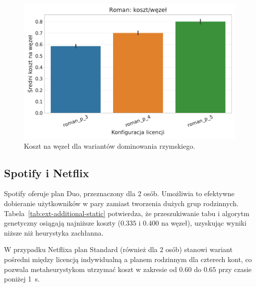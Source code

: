 \begin{figure}[H]
    \centering
    \includegraphics[width=0.6\linewidth]{assets/figures/extensions/static/roman_cost_per_node_comparison.pdf}
    \caption{Koszt na węzeł dla wariantów dominowania rzymskiego.}
    \label{fig:ext-roman-cost}
\end{figure}

\subsection{Spotify i Netflix}

Spotify oferuje plan Duo, przeznaczony dla 2 osób. Umożliwia to efektywne dobieranie użytkowników w pary zamiast tworzenia dużych grup rodzinnych. Tabela~\ref{tab:ext-additional-static} potwierdza, że przeszukiwanie tabu i algorytm genetyczny osiągają najniższe koszty ($0.335$ i $0.400$ na węzeł), uzyskując wyniki niższe niż heurystyka zachłanna.

W przypadku Netflixa plan Standard (również dla 2 osób) stanowi wariant pośredni między licencją indywidualną a planem rodzinnym dla czterech kont, co pozwala metaheurystykom utrzymać koszt w zakresie od $0.60$ do $0.65$ przy czasie poniżej 1~s.

